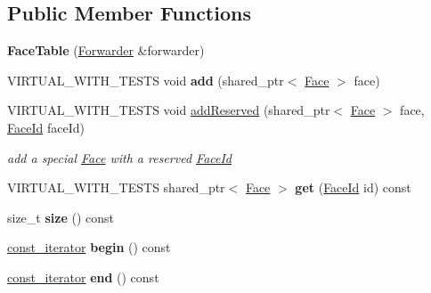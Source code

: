 \subsection*{Public Member Functions}
\begin{DoxyCompactItemize}
\item 
{\bfseries Face\+Table} (\hyperlink{classnfd_1_1Forwarder}{Forwarder} \&forwarder)\hypertarget{classnfd_1_1FaceTable_a9cb5f508f18d98c2070fde1940f06259}{}\label{classnfd_1_1FaceTable_a9cb5f508f18d98c2070fde1940f06259}

\item 
V\+I\+R\+T\+U\+A\+L\+\_\+\+W\+I\+T\+H\+\_\+\+T\+E\+S\+TS void {\bfseries add} (shared\+\_\+ptr$<$ \hyperlink{classnfd_1_1Face}{Face} $>$ face)\hypertarget{classnfd_1_1FaceTable_aa3c99356cabcb953d813539995917973}{}\label{classnfd_1_1FaceTable_aa3c99356cabcb953d813539995917973}

\item 
V\+I\+R\+T\+U\+A\+L\+\_\+\+W\+I\+T\+H\+\_\+\+T\+E\+S\+TS void \hyperlink{classnfd_1_1FaceTable_ac8ab2b76ba95c23bf5c6e2cb42385e25}{add\+Reserved} (shared\+\_\+ptr$<$ \hyperlink{classnfd_1_1Face}{Face} $>$ face, \hyperlink{classFaceId}{Face\+Id} face\+Id)\hypertarget{classnfd_1_1FaceTable_ac8ab2b76ba95c23bf5c6e2cb42385e25}{}\label{classnfd_1_1FaceTable_ac8ab2b76ba95c23bf5c6e2cb42385e25}

\begin{DoxyCompactList}\small\item\em add a special \hyperlink{classnfd_1_1Face}{Face} with a reserved \hyperlink{classFaceId}{Face\+Id} \end{DoxyCompactList}\item 
V\+I\+R\+T\+U\+A\+L\+\_\+\+W\+I\+T\+H\+\_\+\+T\+E\+S\+TS shared\+\_\+ptr$<$ \hyperlink{classnfd_1_1Face}{Face} $>$ {\bfseries get} (\hyperlink{classFaceId}{Face\+Id} id) const\hypertarget{classnfd_1_1FaceTable_ab0e84da83f303e18133d05d99bcbc6d3}{}\label{classnfd_1_1FaceTable_ab0e84da83f303e18133d05d99bcbc6d3}

\item 
size\+\_\+t {\bfseries size} () const\hypertarget{classnfd_1_1FaceTable_a8e9a16831062403ba6e52bef6972cad6}{}\label{classnfd_1_1FaceTable_a8e9a16831062403ba6e52bef6972cad6}

\item 
\hyperlink{classnfd_1_1FaceTable_ac46211392a2e8640782e802e414ca52d}{const\+\_\+iterator} {\bfseries begin} () const\hypertarget{classnfd_1_1FaceTable_aa2866e0e0bfa6327afc4800c784be611}{}\label{classnfd_1_1FaceTable_aa2866e0e0bfa6327afc4800c784be611}

\item 
\hyperlink{classnfd_1_1FaceTable_ac46211392a2e8640782e802e414ca52d}{const\+\_\+iterator} {\bfseries end} () const\hypertarget{classnfd_1_1FaceTable_a1c03857d6d6355ea06c791cc8e7b271e}{}\label{classnfd_1_1FaceTable_a1c03857d6d6355ea06c791cc8e7b271e}

\end{DoxyCompactItemize}
